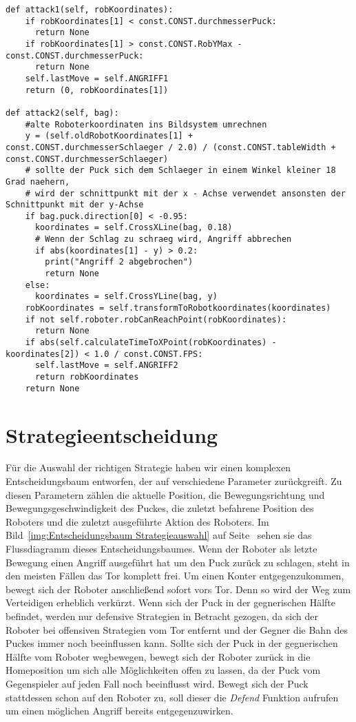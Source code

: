 \pagebreak
\begin{lstlisting}[caption= python-funktion für Offensivstrategien, label=lst:Offensivstrategien]
def attack1(self, robKoordinates):
	if robKoordinates[1] < const.CONST.durchmesserPuck:
	  return None
	if robKoordinates[1] > const.CONST.RobYMax - const.CONST.durchmesserPuck:
	  return None
	self.lastMove = self.ANGRIFF1
	return (0, robKoordinates[1])
    
def attack2(self, bag):
	#alte Roboterkoordinaten ins Bildsystem umrechnen
	y = (self.oldRobotKoordinates[1] + const.CONST.durchmesserSchlaeger / 2.0) / (const.CONST.tableWidth +  const.CONST.durchmesserSchlaeger)
	# sollte der Puck sich dem Schlaeger in einem Winkel kleiner 18 Grad naehern,
	# wird der schnittpunkt mit der x - Achse verwendet ansonsten der Schnittpunkt mit der y-Achse
	if bag.puck.direction[0] < -0.95:
	  koordinates = self.CrossXLine(bag, 0.18)
	  # Wenn der Schlag zu schraeg wird, Angriff abbrechen
	  if abs(koordinates[1] - y) > 0.2:
	    print("Angriff 2 abgebrochen")
	    return None
	else:
	  koordinates = self.CrossYLine(bag, y)	
	robKoordinates = self.transformToRobotkoordinates(koordinates)
	if not self.roboter.robCanReachPoint(robKoordinates):
	  return None
	if abs(self.calculateTimeToXPoint(robKoordinates) - koordinates[2]) < 1.0 / const.CONST.FPS:
	  self.lastMove = self.ANGRIFF2
	  return robKoordinates
	return None
\end{lstlisting}

\section{Strategieentscheidung}
\label{sec:Strategieentscheidung}
Für die Auswahl der richtigen Strategie haben wir einen komplexen Entscheidungsbaum entworfen, der auf verschiedene Parameter zurückgreift. Zu diesen Parametern zählen die aktuelle Position, die Bewegungsrichtung und Bewegungsgeschwindigkeit des Puckes, die zuletzt befahrene Position des Roboters und die zuletzt ausgeführte Aktion des Roboters. Im Bild~\ref{img:Entscheidungsbaum Strategieauswahl} auf Seite~\pageref{img:Entscheidungsbaum Strategieauswahl} sehen sie das Flussdiagramm dieses Entscheidungsbaumes. Wenn der Roboter als letzte Bewegung einen Angriff ausgeführt hat um den Puck zurück zu schlagen, steht in den meisten Fällen das Tor komplett frei. Um einen Konter entgegenzukommen, bewegt sich der Roboter anschließend sofort vors Tor. Denn so wird der Weg zum Verteidigen erheblich verkürzt. Wenn sich der Puck in der gegnerischen Hälfte befindet, werden nur defensive Strategien in Betracht gezogen, da sich der Roboter bei offensiven Strategien vom Tor entfernt und der Gegner die Bahn des Puckes immer noch beeinflussen kann. Sollte sich der Puck in der gegnerischen Hälfte vom Roboter wegbewegen, bewegt sich der Roboter zurück in die Homeposition um sich alle Möglichkeiten offen zu lassen, da der Puck vom Gegenspieler auf jeden Fall noch beeinflusst wird. Bewegt sich der Puck stattdessen schon auf den Roboter zu, soll dieser die \textit{Defend} Funktion aufrufen um einen möglichen Angriff bereits entgegenzuwirken.

